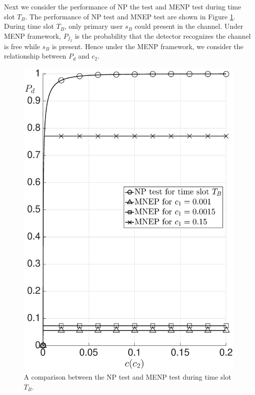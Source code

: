 Next we consider the performance of NP the test and MENP test during time slot $T_B$.
The performance of NP test and MNEP test are shown in Figure \ref{pic:20150704a0}. During time slot $T_B$, only primary user $s_B$ could present in the channel. Under MENP framework, $P_{f_2}$ is the probability that the detector recognizes the channel is free while $s_B$ is present. Hence under the MENP framework, we consider the relationship between $P_d$ and $c_2$.

\begin{figure}[!hbp]
  \centering
  \includegraphics[width = 14cm]{5/SIb.eps}
  \caption{A comparison between the NP test and MENP test during time slot $T_B$.} 
  \label{pic:20150704a0}
\end{figure} 


